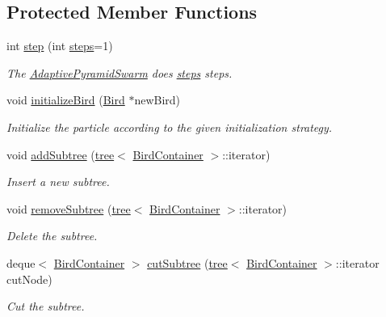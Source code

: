 \subsection*{Protected Member Functions}
\begin{CompactItemize}
\item 
int \hyperlink{classAdaptivePyramidSwarm_0d2d0278504ad096f288d8efe5dbf360}{step} (int \hyperlink{runpso_8cpp_b4ae7205573977222eadd0795db193e2}{steps}=1)
\begin{CompactList}\small\item\em The \hyperlink{classAdaptivePyramidSwarm}{AdaptivePyramidSwarm} does \hyperlink{runpso_8cpp_b4ae7205573977222eadd0795db193e2}{steps} steps. \item\end{CompactList}\item 
void \hyperlink{classAdaptivePyramidSwarm_4589069dda7b2f37f71792ac72cd2fa0}{initializeBird} (\hyperlink{classBird}{Bird} $\ast$newBird)
\begin{CompactList}\small\item\em Initialize the particle according to the given initialization strategy. \item\end{CompactList}\item 
void \hyperlink{classAdaptivePyramidSwarm_45c5cc5ee2e6608d899f1b79b8ad170a}{addSubtree} (\hyperlink{classtree}{tree}$<$ \hyperlink{structBirdContainer}{BirdContainer} $>$::iterator)
\begin{CompactList}\small\item\em Insert a new subtree. \item\end{CompactList}\item 
void \hyperlink{classAdaptivePyramidSwarm_bc68c769114ea5cca2acf90938232418}{removeSubtree} (\hyperlink{classtree}{tree}$<$ \hyperlink{structBirdContainer}{BirdContainer} $>$::iterator)
\begin{CompactList}\small\item\em Delete the subtree. \item\end{CompactList}\item 
deque$<$ \hyperlink{structBirdContainer}{BirdContainer} $>$ \hyperlink{classAdaptivePyramidSwarm_95f5eb1095a6dd003b1477290c80780f}{cutSubtree} (\hyperlink{classtree}{tree}$<$ \hyperlink{structBirdContainer}{BirdContainer} $>$::iterator cutNode)
\begin{CompactList}\small\item\em Cut the subtree. \item\end{CompactList}\item 

\end{CompactItemize}
